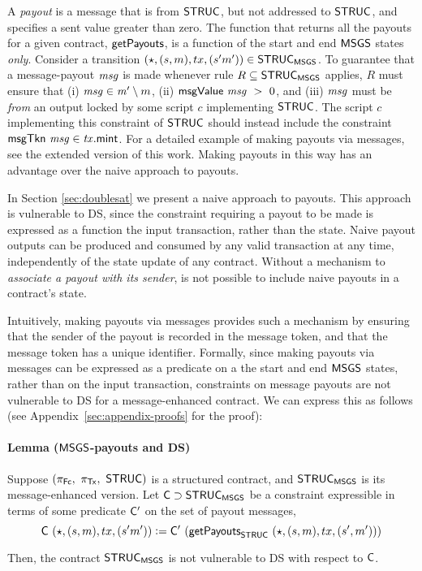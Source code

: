 A \emph{payout} is a message that is from $\mathsf{STRUC}$, but not addressed to $\mathsf{STRUC}$, and
specifies a sent value greater than zero. The function that
returns all the payouts for a given contract, $\mathsf{getPayouts}$, is a function
of the start and end $\mathsf{MSGS}$ states \emph{only}.
Consider a transition $(\star, (s, m), tx, (s' m')) \in \mathsf{STRUC}_{\mathsf{MSGS}}$.
To guarantee that a message-payout $\mathit{msg}$ is made whenever rule $R \subseteq \mathsf{STRUC}_{\mathsf{MSGS}}$
applies, $R$ must ensure that (i) $\mathit{msg} \in \mathit{m'} \setminus m$,
(ii) $\mathsf{msgValue}~\mathit{msg} ~>~ 0$, and (iii) $\mathit{msg}$ must be \emph{from} an output
locked by some script $c$ implementing $\mathsf{STRUC}$.
The script $c$ implementing this constraint of $\mathsf{STRUC}$ should
instead include the constraint $\mathsf{msgTkn}~\mathit{msg} \in \mathit{tx} . \mathsf{mint}$. For a detailed example
of making payouts via messages, see the extended version of this work.
Making payouts in this way has an advantage over the naive approach to payouts.

In Section \ref{sec:doublesat} we present a naive approach to payouts. This approach is
vulnerable to DS, since the constraint requiring a payout to be made is expressed
as a function the input transaction, rather than the state.
Naive payout outputs can be produced and consumed by any valid transaction at any time,
independently of the state update of any contract.
Without a mechanism to \emph{associate a payout with its sender}, is not possible to
include naive payouts in a contract's state.

Intuitively, making payouts via messages provides such a mechanism by ensuring that the
sender of the payout is recorded in the message token, and that the message token
has a unique identifier. Formally, since making payouts via messages can be expressed as
a predicate on a the start and end $\mathsf{MSGS}$ states, rather than on the input transaction,
constraints on message payouts are not vulnerable to DS for a message-enhanced contract.
We can express this as follows (see Appendix~\ref{sec:appendix-proofs} for the proof):

\paragraph{Lemma ($\mathsf{MSGS}$-payouts and DS)}
Suppose $(\pi_{\mathsf{Fc}},~\pi_{\mathsf{Tx}},~\mathsf{STRUC})$ is a structured contract,
and $\mathsf{STRUC}_{\mathsf{MSGS}}$ is its message-enhanced version.
Let $\mathsf{C} \supset \mathsf{STRUC}_{\mathsf{MSGS}}$ be a constraint expressible in terms of
some predicate $\mathsf{C'}$ on the set of payout messages,
\[\mathsf{C}~(\star, (s, m), tx, (s' m')) \mathrel{\mathop:}= \mathsf{C'}~(\mathsf{getPayouts}_{\mathsf{STRUC}}~(\star, (s, m), tx, (s', m'))) \]

Then, the contract $\mathsf{STRUC}_{\mathsf{MSGS}}$ is not vulnerable to DS with respect to $\mathsf{C}$.
